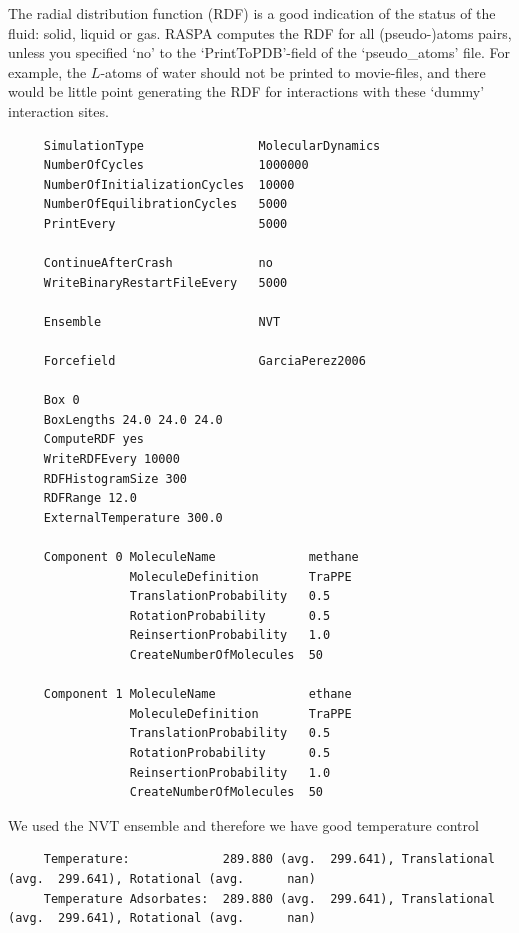 The radial distribution function (RDF) is a good indication of the status of the fluid: solid, liquid or gas. RASPA
computes the RDF for all (pseudo-)atoms pairs, unless you specified `no' to the `PrintToPDB'-field of the `pseudo\_atoms' file.
For example, the $L$-atoms of water should not be printed to movie-files, and there would be little point generating
the RDF for interactions with these `dummy' interaction sites.
\begin{tiny}
\begin{verbatim}
     SimulationType                MolecularDynamics
     NumberOfCycles                1000000
     NumberOfInitializationCycles  10000
     NumberOfEquilibrationCycles   5000
     PrintEvery                    5000
     
     ContinueAfterCrash            no
     WriteBinaryRestartFileEvery   5000
     
     Ensemble                      NVT
     
     Forcefield                    GarciaPerez2006
     
     Box 0
     BoxLengths 24.0 24.0 24.0
     ComputeRDF yes
     WriteRDFEvery 10000
     RDFHistogramSize 300
     RDFRange 12.0
     ExternalTemperature 300.0
     
     Component 0 MoleculeName             methane
                 MoleculeDefinition       TraPPE
                 TranslationProbability   0.5
                 RotationProbability      0.5
                 ReinsertionProbability   1.0
                 CreateNumberOfMolecules  50
     
     Component 1 MoleculeName             ethane
                 MoleculeDefinition       TraPPE
                 TranslationProbability   0.5
                 RotationProbability      0.5
                 ReinsertionProbability   1.0
                 CreateNumberOfMolecules  50
\end{verbatim}
\end{tiny}

We used the NVT ensemble and therefore we have good temperature control
\begin{tiny}
\begin{verbatim}
     Temperature:             289.880 (avg.  299.641), Translational (avg.  299.641), Rotational (avg.      nan)
     Temperature Adsorbates:  289.880 (avg.  299.641), Translational (avg.  299.641), Rotational (avg.      nan)
\end{verbatim}
\end{tiny}

